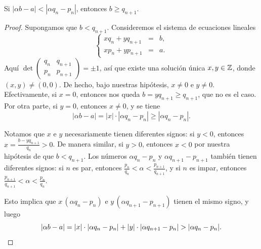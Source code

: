 \begin{proposicion}
  Si $|\alpha b - a| < |\alpha q_n - p_n|$, entonces $b \ge q_{n+1}$.

  \begin{proof}
    Supongamos que $b < q_{n+1}$. Consideremos el sistema de ecuaciones
    lineales
    \[ \left\{\begin{array}{rcl}
      x q_n + y q_{n+1} & = & b, \\
      x p_n + y p_{n+1} & = & a.
    \end{array}\right. \]
    Aquí $\det \begin{pmatrix}
      q_n & q_{n+1} \\
      p_n & p_{n+1}
    \end{pmatrix} = \pm 1$, así que existe una solución única
    $x,y\in \mathbb{Z}$, donde $(x,y) \ne (0,0)$. De hecho, bajo nuestras hipótesis,
    $x\ne 0$ e $y \ne 0$. Efectivamente, si $x = 0$, entonces nos queda
    $b = y q_{n+1} \ge q_{n+1}$, que no es el caso. Por otra parte, si $y = 0$,
    entonces $x \ne 0$, y se tiene
    $$|\alpha b - a| = |x|\cdot |\alpha q_n - p_n| \ge |\alpha q_n - p_n|.$$

    Notamos que $x$ e $y$ necesariamente tienen diferentes signos: si $y < 0$,
    entonces $x = \frac{b - y q_{n+1}}{q_n} > 0$. De manera similar, si $y > 0$,
    entonces $x < 0$ por nuestra hipótesis de que $b < q_{n+1}$. Los números
    $\alpha q_n - p_n$ y $\alpha q_{n+1} - p_{n+1}$ también tienen diferentes
    signos: si $n$ es par, entonces
    $\frac{p_n}{q_n} < \alpha < \frac{p_{n+1}}{q_{n+1}}$,
    y si $n$ es impar, entonces
    $\frac{p_{n+1}}{q_{n+1}} < \alpha < \frac{p_n}{q_n}$.

    Esto implica que $x\,(\alpha q_n - p_n)$ e
    $y\,(\alpha q_{n+1} - p_{n+1})$ tienen el mismo signo, y luego
    \[ |\alpha b - a| =
       |x|\cdot |\alpha q_n - p_n| + |y|\cdot |\alpha q_{n+1} - p_n| >
       |\alpha q_n - p_n|. \qedhere \]
  \end{proof}
\end{proposicion}


